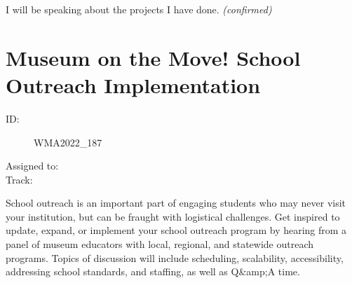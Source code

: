 \documentclass{report}
\begin{document}
                I will be speaking about the projects I have done.
                \emph{ (confirmed) }
              

              

              

              
        
          \newpage
          \section{ Museum on the Move! School Outreach Implementation }
            \begin{description}
              \item [ID:]
              WMA2022\_187

              \item [Assigned to:]
                \item [Track:]
              \end{description}

              School outreach is an important part of engaging students who may never visit your institution, but can be fraught with logistical challenges. Get inspired to update, expand, or implement your school outreach program by hearing from a panel of museum educators with local, regional, and statewide outreach programs.	 Topics of discussion will include scheduling, scalability, accessibility, addressing school standards, and staffing, as well as Q\&amp;A time.
\end{document}
